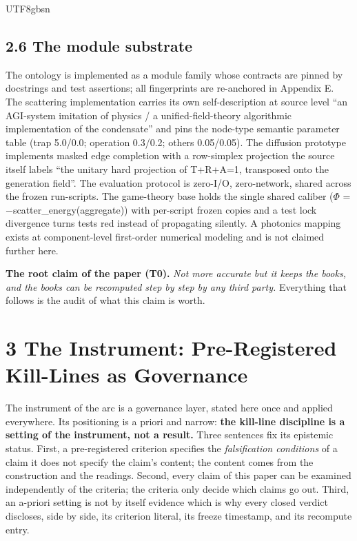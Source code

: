 \documentclass[11pt,letterpaper]{article}
\begin{document}
\begin{CJK}{UTF8}{gbsn}
\subsection*{2.6 The module substrate}

The ontology is implemented as a module family whose contracts are pinned by docstrings and test assertions; all fingerprints are re-anchored in Appendix E. The scattering implementation carries its own self-description at source level \textemdash{} ``an AGI-system imitation of physics / a unified-field-theory algorithmic implementation of the condensate'' \textemdash{} and pins the node-type semantic parameter table (trap 5.0/0.0; operation 0.3/0.2; others 0.05/0.05). The diffusion prototype implements masked edge completion with a row-simplex projection the source itself labels ``the unitary hard projection of T+R+A=1, transposed onto the generation field''. The evaluation protocol is zero-I/O, zero-network, shared across the frozen run-scripts. The game-theory base holds the single shared caliber (\ensuremath{\Phi} = \ensuremath{-}scatter\_energy(aggregate)) with per-script frozen copies and a test lock \textemdash{} divergence turns tests red instead of propagating silently. A photonics mapping exists at component-level first-order numerical modeling and is not claimed further here.

\textbf{The root claim of the paper (T0).} \emph{Not more accurate \textemdash{} but it keeps the books, and the books can be recomputed step by step by any third party.} Everything that follows is the audit of what this claim is worth.

\section*{3 The Instrument: Pre-Registered Kill-Lines as Governance}

The instrument of the arc is a governance layer, stated here once and applied everywhere. Its positioning is a priori and narrow: \textbf{the kill-line discipline is a setting of the instrument, not a result.} Three sentences fix its epistemic status. First, a pre-registered criterion specifies the \emph{falsification conditions} of a claim \textemdash{} it does not specify the claim's content; the content comes from the construction and the readings. Second, every claim of this paper can be examined independently of the criteria; the criteria only decide which claims go out. Third, an a-priori setting is not by itself evidence \textemdash{} which is why every closed verdict discloses, side by side, its criterion literal, its freeze timestamp, and its recompute entry.


\end{CJK}
\end{document}
